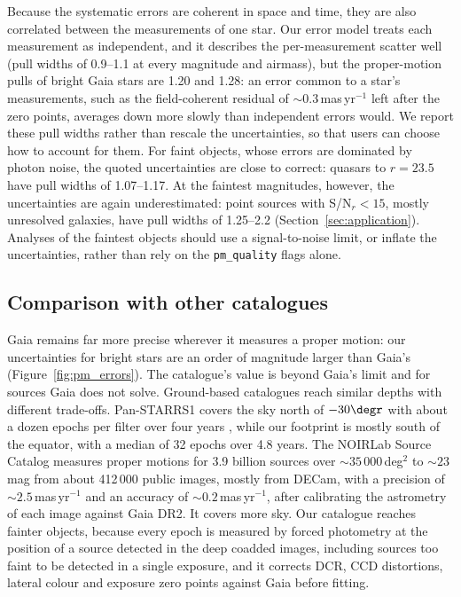 \documentclass[usenatbib]{mnras}   %
\begin{document}
Because the systematic errors are coherent in space and time, they are also correlated between the measurements of one star. Our error model treats each measurement as independent, and it describes the per-measurement scatter well (pull widths of 0.9--1.1 at every magnitude and airmass), but the proper-motion pulls of bright Gaia stars are 1.20 and 1.28: an error common to a star's measurements, such as the field-coherent residual of $\sim\!0.3$\,mas\,yr$^{-1}$ left after the zero points, averages down more slowly than independent errors would. We report these pull widths rather than rescale the uncertainties, so that users can choose how to account for them. For faint objects, whose errors are dominated by photon noise, the quoted uncertainties are close to correct: quasars to $r = 23.5$ have pull widths of 1.07--1.17. At the faintest magnitudes, however, the uncertainties are again underestimated: point sources with S/N$_r < 15$, mostly unresolved galaxies, have pull widths of 1.25--2.2 (Section~\ref{sec:application}). Analyses of the faintest objects should use a signal-to-noise limit, or inflate the uncertainties, rather than rely on the \texttt{pm\_quality} flags alone.

\subsection{Comparison with other catalogues}

Gaia remains far more precise wherever it measures a proper motion: our uncertainties for bright stars are an order of magnitude larger than Gaia's (Figure~\ref{fig:pm_errors}). The catalogue's value is beyond Gaia's limit and for sources Gaia does not solve. Ground-based catalogues reach similar depths with different trade-offs. Pan-STARRS1 covers the sky north of $-30\degr$ with about a dozen epochs per filter over four years \citep{PanSTARRS_2016}, while our footprint is mostly south of the equator, with a median of 32 epochs over 4.8 years. The NOIRLab Source Catalog \citep{Nidever2021} measures proper motions for 3.9 billion sources over $\sim\!35\,000$\,deg$^2$ to $\sim\!23$\,mag from about 412\,000 public images, mostly from DECam, with a precision of $\sim\!2.5$\,mas\,yr$^{-1}$ and an accuracy of $\sim\!0.2$\,mas\,yr$^{-1}$, after calibrating the astrometry of each image against Gaia DR2. It covers more sky. Our catalogue reaches fainter objects, because every epoch is measured by forced photometry at the position of a source detected in the deep coadded images, including sources too faint to be detected in a single exposure, and it corrects DCR, CCD distortions, lateral colour and exposure zero points against Gaia before fitting.
\end{document}
